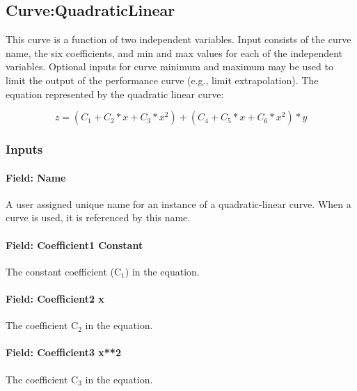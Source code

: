 \subsection{Curve:QuadraticLinear}\label{curvequadraticlinear}

This curve is a function of two independent variables. Input consists of the curve name, the six coefficients, and min and max values for each of the independent variables. Optional inputs for curve minimum and maximum may be used to limit the output of the performance curve (e.g., limit extrapolation). The equation represented by the quadratic linear curve:

\begin{equation}
z = \left( {{C_1} + {C_2}*x + {C_3}*{x^2}} \right) + \left( {{C_4} + {C_5}*x + {C_6}*{x^2}} \right)*y
\end{equation}

\subsubsection{Inputs}\label{inputs-9-012}

\paragraph{Field: Name}\label{field-name-10-010}

A user assigned unique name for an instance of a quadratic-linear curve. When a curve is used, it is referenced by this name.

\paragraph{Field: Coefficient1 Constant}\label{field-coefficient1-constant-9}

The constant coefficient (C\(_{1}\)) in the equation.

\paragraph{Field: Coefficient2 x}\label{field-coefficient2-x-7}

The coefficient C\(_{2}\) in the equation.

\paragraph{Field: Coefficient3 x**2}\label{field-coefficient3-x2-5}

The coefficient C\(_{3}\) in the equation.

